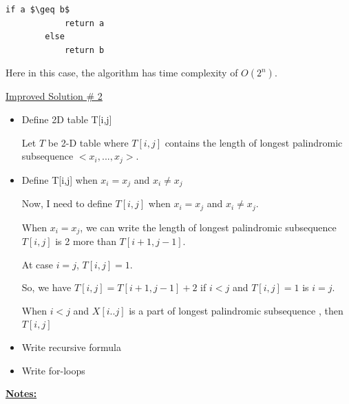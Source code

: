 \documentclass[12pt]{article}
\begin{document}
\begin{enumerate}[1.]
\begin{itemize}
\begin{lstlisting}[mathescape=true]
        if a $\geq b$
            return a
        else
            return b
    \end{lstlisting}

    \bigskip

    Here in this case, the algorithm has time complexity of $O(2^n)$.

    \bigskip

    \underline{Improved Solution \# 2}

    \bigskip

    \begin{itemize}
        \item Define 2D table T[i,j]

        \begin{mdframed}
        Let $T$ be 2-D table where $T[i,j]$ contains the length of longest palindromic
        subsequence $<x_i,...,x_j>$.
        \end{mdframed}

        \item Define T[i,j] when $x_i = x_j$ and $x_i \neq x_j$

        \begin{mdframed}
        Now, I need to define $T[i,j]$ when $x_i = x_j$ and $x_i \neq x_j$.

        \bigskip

        When $x_i = x_j$, we can write the length of longest palindromic subsequence $T[i,j]$
        is 2 more than $T[i+1,j-1]$.

        \bigskip

        At case $i = j$, $T[i,j] = 1$.

        \bigskip

        So, we have $T[i,j]=T[i+1,j-1] + 2$ if $i < j$ and $T[i,j] = 1$ is $i = j$.

        \bigskip

        When $i < j$ and $X[i..j]$ is a part of longest palindromic subsequence , then $T[i,j]$



        \bigskip


        \end{mdframed}

        \item Write recursive formula

        \item Write for-loops
    \end{itemize}

    \end{itemize}
    \underline{\textbf{Notes:}}


\end{enumerate}
\end{document}

